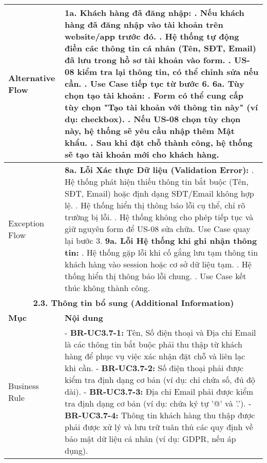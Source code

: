 \begin{longtable}{|m{4cm}|p{11cm}|}
\hline
Alternative Flow & \textbf{1a. Khách hàng đã đăng nhập:} \newline    1. Nếu khách hàng đã đăng nhập vào tài khoản trên website/app trước đó. \newline    2. Hệ thống tự động điền các thông tin cá nhân (Tên, SĐT, Email) đã lưu trong hồ sơ tài khoản vào form. \newline    3. US-08 kiểm tra lại thông tin, có thể chỉnh sửa nếu cần. \newline    4. Use Case tiếp tục từ bước 6. \newline \textbf{6a. Tùy chọn tạo tài khoản:} \newline    1. Form có thể cung cấp tùy chọn "Tạo tài khoản với thông tin này" (ví dụ: checkbox). \newline    2. Nếu US-08 chọn tùy chọn này, hệ thống sẽ yêu cầu nhập thêm Mật khẩu. \newline    3. Sau khi đặt chỗ thành công, hệ thống sẽ tạo tài khoản mới cho khách hàng. \\
\hline
Exception Flow & \textbf{8a. Lỗi Xác thực Dữ liệu (Validation Error):} \newline    1. Hệ thống phát hiện thiếu thông tin bắt buộc (Tên, SĐT, Email) hoặc định dạng SĐT/Email không hợp lệ. \newline    2. Hệ thống hiển thị thông báo lỗi cụ thể, chỉ rõ trường bị lỗi. \newline    3. Hệ thống không cho phép tiếp tục và giữ nguyên form để US-08 sửa chữa. Use Case quay lại bước 3. \newline \textbf{9a. Lỗi Hệ thống khi ghi nhận thông tin:} \newline    1. Hệ thống gặp lỗi khi cố gắng lưu tạm thông tin khách hàng vào session hoặc cơ sở dữ liệu tạm. \newline    2. Hệ thống hiển thị thông báo lỗi chung. \newline    3. Use Case kết thúc không thành công. \\
\hline
\multicolumn{2}{|c|}{\textbf{2.3. Thông tin bổ sung (Additional Information)}} \\
\hline
\textbf{Mục} & \textbf{Nội dung} \\
\hline
Business Rule & - \textbf{BR-UC3.7-1:} Tên, Số điện thoại và Địa chỉ Email là các thông tin bắt buộc phải thu thập từ khách hàng để phục vụ việc xác nhận đặt chỗ và liên lạc khi cần. \newline - \textbf{BR-UC3.7-2:} Số điện thoại phải được kiểm tra định dạng cơ bản (ví dụ: chỉ chứa số, đủ độ dài). \newline - \textbf{BR-UC3.7-3:} Địa chỉ Email phải được kiểm tra định dạng cơ bản (ví dụ: chứa ký tự '@' và '.'). \newline - \textbf{BR-UC3.7-4:} Thông tin khách hàng thu thập được phải được xử lý và lưu trữ tuân thủ các quy định về bảo mật dữ liệu cá nhân (ví dụ: GDPR, nếu áp dụng). \\

\end{longtable}
